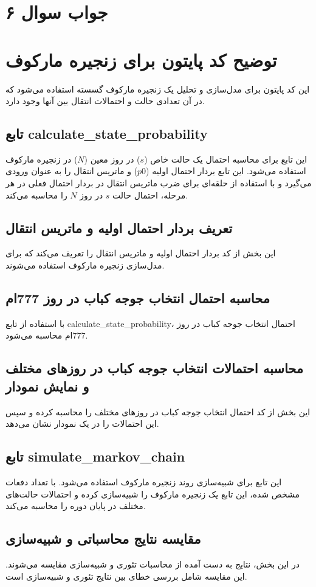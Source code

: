 \section*{جواب سوال ۶}

\section*{توضیح کد پایتون برای زنجیره مارکوف}

این کد پایتون برای مدل‌سازی و تحلیل یک زنجیره مارکوف گسسته استفاده می‌شود که در آن تعدادی حالت و احتمالات انتقال بین آنها وجود دارد.

\subsection*{تابع calculate\_state\_probability}
این تابع برای محاسبه احتمال یک حالت خاص (\(s\)) در روز معین (\(N\)) در زنجیره مارکوف استفاده می‌شود. این تابع بردار احتمال اولیه (\(p0\)) و ماتریس انتقال را به عنوان ورودی می‌گیرد و با استفاده از حلقه‌ای برای ضرب ماتریس انتقال در بردار احتمال فعلی در هر مرحله، احتمال حالت \(s\) در روز \(N\) را محاسبه می‌کند.

\subsection*{تعریف بردار احتمال اولیه و ماتریس انتقال}
این بخش از کد بردار احتمال اولیه و ماتریس انتقال را تعریف می‌کند که برای مدل‌سازی زنجیره مارکوف استفاده می‌شوند.

\subsection*{محاسبه احتمال انتخاب جوجه کباب در روز 777ام}
با استفاده از تابع calculate\_state\_probability، احتمال انتخاب جوجه کباب در روز 777ام محاسبه می‌شود.

\subsection*{محاسبه احتمالات انتخاب جوجه کباب در روزهای مختلف و نمایش نمودار}
این بخش از کد احتمال انتخاب جوجه کباب در روزهای مختلف را محاسبه کرده و سپس این احتمالات را در یک نمودار نشان می‌دهد.

\subsection*{تابع simulate\_markov\_chain}
این تابع برای شبیه‌سازی روند زنجیره مارکوف استفاده می‌شود. با تعداد دفعات مشخص شده، این تابع یک زنجیره مارکوف را شبیه‌سازی کرده و احتمالات حالت‌های مختلف در پایان دوره را محاسبه می‌کند.

\subsection*{مقایسه نتایج محاسباتی و شبیه‌سازی}
در این بخش، نتایج به دست آمده از محاسبات تئوری و شبیه‌سازی مقایسه می‌شوند. این مقایسه شامل بررسی خطای بین نتایج تئوری و شبیه‌سازی است.
